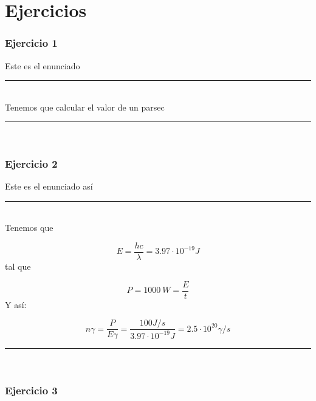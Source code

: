\newpage





\section{Ejercicios}

\subsubsection{Ejercicio 1}

Este es el enunciado 

\rule{\textwidth}{0.1pt} \\[2pt]

Tenemos que calcular el valor de un parsec

\rule{\textwidth}{0.1pt} \\[2pt]

\subsubsection{Ejercicio 2}

Este es el enunciado así

 \rule{\textwidth}{0.1pt} \\[2pt]

Tenemos que 

\begin{equation}
    E = \frac{hc}{\lambda} = 3.97 \cdot 10^{-19} \unit{J}
\end{equation}
tal que

\begin{equation}
    P = 1000 \ \unit{W} = \frac{E}{t}
\end{equation}
Y así:

\begin{equation}
    n \gamma = \frac{P}{E\gamma} = \frac{100 \unit{J/s}}{3.97 \cdot 10^{-19} \unit{J}} = 2.5 \cdot 10^{20} \gamma /\unit{s}
\end{equation}

\rule{\textwidth}{0.1pt} \\[2pt]

\subsubsection{Ejercicio 3}

